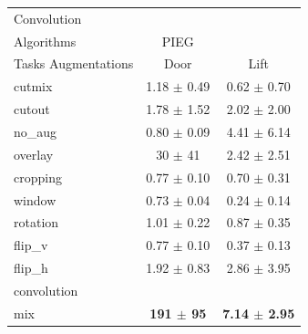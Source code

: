 \begin{tabular}{lcc}
Convolution & & \\
Algorithms & PIEG & \\
Tasks Augmentations & Door & Lift \\
cutmix          & 1.18 $\pm$ 0.49 & 0.62 $\pm$ 0.70 \\
cutout          & 1.78 $\pm$ 1.52 & 2.02 $\pm$ 2.00 \\
no\_aug         & 0.80 $\pm$ 0.09 & 4.41 $\pm$ 6.14 \\
overlay         & 30 $\pm$ 41 & 2.42 $\pm$ 2.51 \\
cropping        & 0.77 $\pm$ 0.10 & 0.70 $\pm$ 0.31 \\
window          & 0.73 $\pm$ 0.04 & 0.24 $\pm$ 0.14 \\
rotation        & 1.01 $\pm$ 0.22 & 0.87 $\pm$ 0.35 \\
flip\_v         & 0.77 $\pm$ 0.10 & 0.37 $\pm$ 0.13 \\
flip\_h         & 1.92 $\pm$ 0.83 & 2.86 $\pm$ 3.95 \\
convolution     &  &  \\
mix             & \textbf{191 $\pm$ 95} & \textbf{7.14 $\pm$ 2.95} \\
\end{tabular}